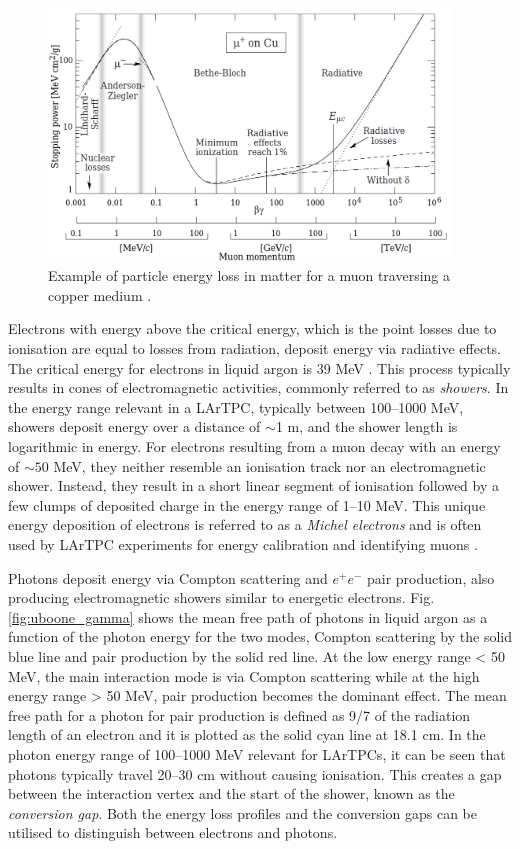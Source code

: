 \begin{figure}[ht!] 
\centering    
\includegraphics[width=0.95\textwidth]{BetheBloch}
\caption[BetheBloch]{
Example of particle energy loss in matter for a muon traversing a copper medium \cite{Passage}.
}
\label{fig:BetheBloch}
\end{figure}

Electrons with energy above the critical energy, which is the point losses due to ionisation are equal to losses from radiation, deposit energy via radiative effects.
The critical energy for electrons in liquid argon is 39 MeV \cite{uboone_gamma}.
This process typically results in cones of electromagnetic activities, commonly referred to as \textit{showers}.
In the energy range relevant in a LArTPC, typically between 100--1000 MeV, showers deposit energy over a distance of $\sim$1 m, and the shower length is logarithmic in energy.
For electrons resulting from a muon decay with an energy of $\sim50$ MeV, they neither resemble an ionisation track nor an electromagnetic shower.
Instead, they result in a short linear segment of ionisation followed by a few clumps of deposited charge in the energy range of 1--10 MeV.
This unique energy deposition of electrons is referred to as a \textit{Michel electrons} and is often used by LArTPC experiments for energy calibration and identifying muons  \cite{uboone_michel}.

Photons deposit energy via Compton scattering and $e^+e^-$ pair production, also producing electromagnetic showers similar to energetic electrons.
Fig. \ref{fig:uboone_gamma} shows the mean free path of photons in liquid argon as a function of the photon energy for the two modes, Compton scattering by the solid blue line and pair production by 
the solid red line.
At the low energy range < 50 MeV, the main interaction mode is via Compton scattering while at the high energy range > 50 MeV, pair production becomes the dominant effect.
The mean free path for a photon for pair production is defined as 9/7 of the radiation length of an electron and it is plotted as the solid cyan line at 18.1 cm.
In the photon energy range of 100--1000 MeV relevant for LArTPCs, it can be seen that photons typically travel 20--30 cm without causing ionisation.
This creates a gap between the interaction vertex and the start of the shower, known as the \textit{conversion gap}.
Both the energy loss profiles and the conversion gaps can be utilised to distinguish between electrons and photons. 

